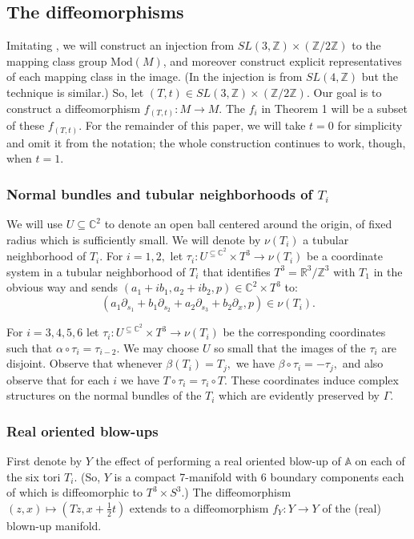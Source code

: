 \documentclass{amsart}
\theoremstyle{theorem}
\theoremstyle{definition}
\theoremstyle{definition}
\theoremstyle{definition}
\theoremstyle{theorem}
\theoremstyle{theorem}
\theoremstyle{theorem}
\theoremstyle{corollary}
\theoremstyle{question}
\theoremstyle{remark}
\begin{document}
\subsection{The diffeomorphisms}

Imitating \cite[Section 2]{FL}, we will construct an injection from $SL(3, \mathbb{Z})\times(\mathbb{Z}/2\mathbb{Z})$ to the mapping class group $\text{Mod}(M)$, and moreover construct explicit representatives of each mapping class in the image. (In \cite{FL} the injection is from $SL(4,\mathbb{Z})$ but the technique is similar.) So, let $(T, t)\in SL(3, \mathbb{Z})\times(\mathbb{Z}/2\mathbb{Z}).$ Our goal is to construct a diffeomorphism $f_{(T,t)}:M\to M.$ The $f_i$ in Theorem 1 will be a subset of these $f_{(T, t)}.$ For the remainder of this paper, we will take $t = 0$ for simplicity and omit it from the notation; the whole construction continues to work, though, when $t = 1.$

\subsubsection{Normal bundles and tubular neighborhoods of $T_i$}
We will use $U\subseteq \mathbb{C}^2$ to denote an open ball centered around the origin, of fixed radius which is sufficiently small. We will denote by $\nu(T_i)$ a tubular neighborhood of $T_i.$ For $i=1,2,$ let $\tau_i: U^{\subseteq\mathbb{C}^2}\times T^3\to \nu(T_i)$ be a coordinate system in a tubular neighborhood of $T_i$ that identifies $T^3 = \mathbb{R}^3/\mathbb{Z}^3$ with $T_1$ in the obvious way and sends $(a_1+ib_1,a_2+ib_2, p)\in \mathbb{C}^2\times T^3$ to: $$(a_1\partial_{s_1}+ b_1\partial_{s_2}+a_2\partial_{s_3}+b_2\partial_x, p)\in\nu(T_i).$$

For $i=3,4,5,6$ let $\tau_i:U^{\subseteq\mathbb{C}^2}\times T^3\to \nu(T_i)$ be the corresponding coordinates such that $\alpha\circ\tau_i=\tau_{i-2}$. We may choose $U$ so small that the images of the $\tau_i$ are disjoint. Observe that whenever $\beta(T_i)=T_j,$ we have $\beta\circ\tau_i=-\tau_j,$ and also observe that for each $i$ we have $T\circ \tau_i=\tau_i\circ T.$ These coordinates induce complex structures on the normal bundles of the $T_i$ which are evidently preserved by $\Gamma.$

\subsubsection{Real oriented blow-ups}
First denote by $Y$ the effect of performing a real oriented blow-up of $\mathbb{A}$ on each of the six tori $T_i.$ (So, $Y$ is a compact 7-manifold with 6 boundary components each of which is diffeomorphic to $T^3\times S^3$.) The diffeomorphism $(z, x) \mapsto(Tz, x+\frac12 t)$ extends to a diffeomorphism $f_Y:Y\to Y$ of the (real) blown-up manifold.
\end{document}
